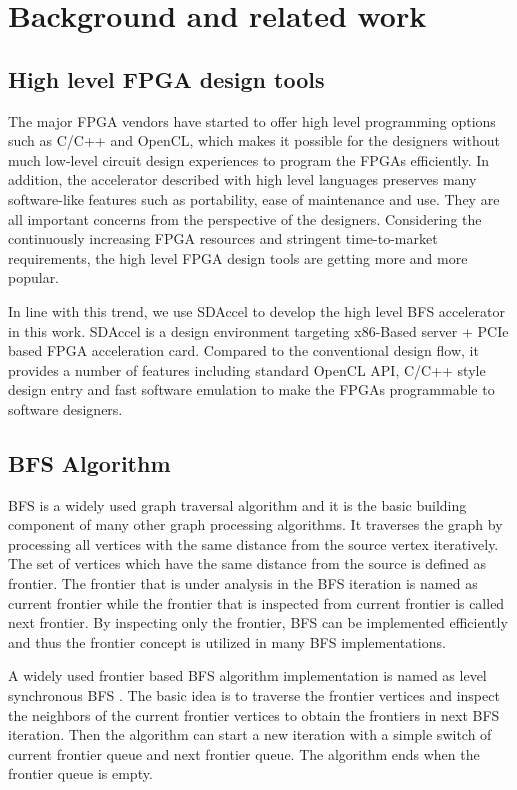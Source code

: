 \section{Background and related work} \label{sec:relatedwork}
\subsection{High level FPGA design tools}
The major FPGA vendors have started 
to offer high level programming options such as C/C++ and OpenCL, which makes 
it possible for the designers without much low-level circuit design 
experiences \cite{nimbix, xilinx-sdaccel, intel-opencl} 
to program the FPGAs efficiently. In addition, the accelerator 
described with high level languages preserves many software-like features 
such as portability, ease of maintenance and use. They are all 
important concerns from the perspective of the designers. Considering the  
continuously increasing FPGA resources and stringent time-to-market requirements, 
the high level FPGA design tools \cite{Nane2016hls-survey} are getting more and more 
popular.

In line with this trend, we use SDAccel \cite{xilinx-sdaccel} to develop the 
high level BFS accelerator in this work. SDAccel is a design environment 
targeting x86-Based server + PCIe based FPGA acceleration card. 
Compared to the conventional design flow, it provides 
a number of features including standard OpenCL API, C/C++ style design entry and
fast software emulation to make the FPGAs programmable to software designers. 


\subsection{BFS Algorithm}
BFS is a widely used graph traversal algorithm and it is the basic 
building component of many other graph processing algorithms. 
It traverses the graph by processing all vertices with the same distance from the 
source vertex iteratively. The set of vertices which have the same distance from the 
source is defined as frontier. The frontier that is under analysis in the BFS iteration 
is named as current frontier while the frontier that is inspected from current frontier 
is called next frontier. By inspecting only the frontier, BFS can be implemented efficiently 
and thus the frontier concept is utilized in many BFS implementations.

A widely used frontier based BFS algorithm implementation is named as 
level synchronous BFS \cite{attia2014cygraph, betkaoui2012reconfigurable, 
zhang2017boosting}. The basic idea is to traverse the frontier vertices and inspect the neighbors 
of the current frontier vertices to obtain the frontiers in next BFS iteration. 
Then the algorithm can start a new iteration with a simple switch of 
current frontier queue and next frontier queue. The algorithm ends when 
the frontier queue is empty.

